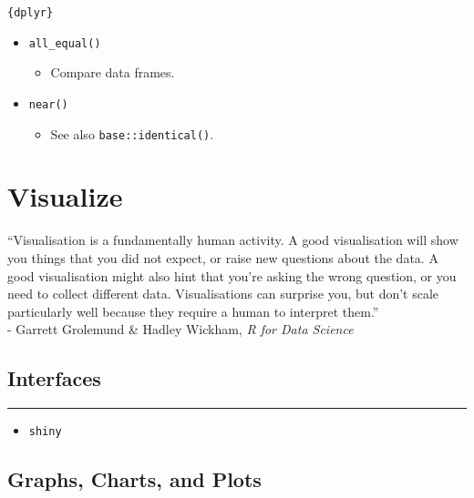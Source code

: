 \documentclass[
]{book}
\providecommand{\tightlist}{%
  \setlength{\itemsep}{0pt}\setlength{\parskip}{0pt}}
\begin{document}
\texttt{\{dplyr\}}

\begin{itemize}
\tightlist
\item
  \texttt{all\_equal()}

  \begin{itemize}
  \tightlist
  \item
    Compare data frames.
  \end{itemize}
\item
  \texttt{near()}

  \begin{itemize}
  \tightlist
  \item
    See also \texttt{base::identical()}.
  \end{itemize}
\end{itemize}

\hypertarget{visualize}{%
\chapter{Visualize}\label{visualize}}

``Visualisation is a fundamentally human activity. A good visualisation will show you things that you did not expect, or raise new questions about the data. A good visualisation might also hint that you're asking the wrong question, or you need to collect different data. Visualisations can surprise you, but don't scale particularly well because they require a human to interpret them.''\\
- Garrett Grolemund \& Hadley Wickham, \emph{R for Data Science}

\hypertarget{interfaces}{%
\section{Interfaces}\label{interfaces}}

\begin{center}\rule{0.5\linewidth}{0.5pt}\end{center}

\begin{itemize}
\tightlist
\item
  \texttt{shiny}
\end{itemize}

\hypertarget{graphs-charts-and-plots}{%
\section{Graphs, Charts, and Plots}\label{graphs-charts-and-plots}}
\end{document}
